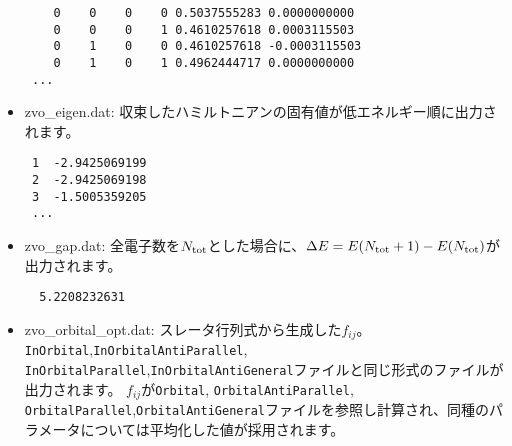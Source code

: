 \begin{itemize}
\begin{minipage}{13cm}
\begin{screen}
\begin{verbatim}
    0    0    0    0 0.5037555283 0.0000000000
    0    0    0    1 0.4610257618 0.0003115503
    0    1    0    0 0.4610257618 -0.0003115503
    0    1    0    1 0.4962444717 0.0000000000
 ...
\end{verbatim}
\end{screen}
\end{minipage}    
    
\item{zvo\_eigen.dat:} 収束したハミルトニアンの固有値が低エネルギー順に出力されます。\\
\begin{minipage}{13cm}
\begin{screen}
\begin{verbatim}
 1  -2.9425069199
 2  -2.9425069198
 3  -1.5005359205 
 ...
\end{verbatim}
\end{screen}
\end{minipage}

\item{zvo\_gap.dat:} 全電子数を$N_{\rm tot}$とした場合に、$\Delta E= E(N_{\rm tot}+1)-E(N_{\rm tot})$が出力されます。

\begin{minipage}{13cm}
\begin{screen}
\begin{verbatim}
  5.2208232631
\end{verbatim}
\end{screen}
\end{minipage}

\item{zvo\_orbital\_opt.dat:} スレータ行列式から生成した$f_{ij}$。\verb|InOrbital|,\verb|InOrbitalAntiParallel|, \verb|InOrbitalParallel|,\verb|InOrbitalAntiGeneral|ファイルと同じ形式のファイルが出力されます。
$f_{ij}$が\verb|Orbital|, \verb|OrbitalAntiParallel|, \verb|OrbitalParallel|,\verb|OrbitalAntiGeneral|ファイルを参照し計算され、同種のパラメータについては平均化した値が採用されます。

\end{itemize}




